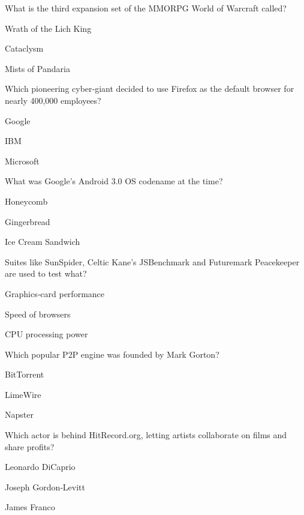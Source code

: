 \begin{enhancedmcq}{What is the third expansion set of the MMORPG World of Warcraft called?}
\item Wrath of the Lich King
\item Cataclysm
\item Mists of Pandaria

\end{enhancedmcq}
\begin{enhancedmcq}{Which pioneering cyber‑giant decided to use Firefox as the default browser for nearly 400,000 employees?}
\item Google
\item IBM
\item Microsoft

\end{enhancedmcq}
\begin{enhancedmcq}{What was Google's Android 3.0 OS codename at the time?}
\item Honeycomb
\item Gingerbread
\item Ice Cream Sandwich

\end{enhancedmcq}
\begin{enhancedmcq}{Suites like SunSpider, Celtic Kane's JSBenchmark and Futuremark Peacekeeper are used to test what?}
\item Graphics‑card performance
\item Speed of browsers
\item CPU processing power

\end{enhancedmcq}
\begin{enhancedmcq}{Which popular P2P engine was founded by Mark Gorton?}
\item BitTorrent
\item LimeWire
\item Napster

\end{enhancedmcq}
\begin{enhancedmcq}{Which actor is behind HitRecord.org, letting artists collaborate on films and share profits?}
\item Leonardo DiCaprio
\item Joseph Gordon‑Levitt
\item James Franco

\end{enhancedmcq}
